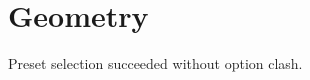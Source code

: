 \documentclass{impebook}
\begin{document}
\chapter{Geometry}
Preset selection succeeded without option clash.
\end{document}
